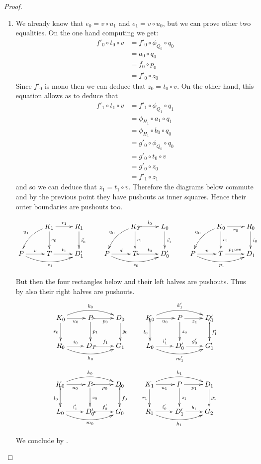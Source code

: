 \begin{proof}
\begin{enumerate}
	\item We already know that $e_0=v\circ u_1$ and $e_1=v\circ u_0$, but we can prove other two equalities. On the one hand computing we get:
	\begin{align*}
		f'_0\circ t_0\circ v&=f'_0\circ \phi_{Q_0}\circ q_0\\&=a_0\circ q_0\\&=f_0\circ p_0\\&=f'_0\circ z_0
	\end{align*}
	Since $f'_0$ is mono then we can deduce that $z_0=t_0\circ v$. On the other hand, this equation allows as to deduce that
	\begin{align*}
	f'_1\circ t_1\circ v&=f'_1\circ \phi_{Q_1}\circ q_1\\&=\phi_{H_1}\circ a_1\circ q_1\\&=\phi_{H_1}\circ b_0\circ q_0\\&=g'_0\circ \phi_{Q_0}\circ q_0\\&=g'_0\circ t_0\circ v\\&=g'_0\circ z_0\\&=f'_1\circ z_1
	\end{align*}
	and so we can deduce that $z_1=t_1\circ v$. Therefore the diagrams below commute and by the previous point they have pushouts as inner squares. Hence their outer boundaries are pushouts too.
	 
	\[\xymatrix{&K_1  \ar@/_.3cm/[dl]_{u_1}\ar[d]^{e_0} \ar[r]^{r_1} & R_1 \ar[d]^{i'_0} && K_0 \ar@/_.3cm/[dl]_{u_0}\ar@{>->}[r]^{l_0} \ar[d]^{e_1}& L_0 \ar[d]^{i'_1}&& K_0 \ar@/_.3cm/[dl]_{u_0} \ar[r]_{r_0} \ar[d]^{e_1}& R_0  \ar[d]^{i_0}\\ P\ar@/_.4cm/[rr]_{z_1}\ar[r]^{v} &T \ar[r]^{t_1} &  D'_1 &P \ar@/_.4cm/[rr]_{z_0}\ar[r]^{d}& T \ar@{>->}[r]^{t_0}  &D'_0 &P\ar@/_.4cm/[rr]_{p_1}\ar[r]^{v}&T \ar[r]^-{p_1\circ w}& D_1}\]
	
	But then the four rectangles below and their left halves are pushouts. Thus by  also their right halves are pushouts. 
	\[\xymatrix{K_0 \ar@/^.4cm/[rr]^{k_0}\ar[d]_{r_0}\ar[r]_{u_0}
		&P\ar[d]^{p_1} \ar@{>->}[r]_{p_0} & D_0 \ar[d]^{g_0}&K_0
		\ar@/^.4cm/[rr]^{k'_1}\ar@{>->}[d]_{l_0}\ar[r]_{u_0}
		&P\ar@{>}[d]^{z_0} \ar[r]_{z_1} & D'_1 \ar@{>->}[d]^{f'_1}\\
		R_0 \ar@/_.4cm/[rr]_{h_0} \ar[r]^{i_0}&D_1 \ar@{>->}[r]^{f_1}
		& G_1&L_0 \ar@/_.4cm/[rr]_{m'_1} \ar[r]^{i'_1}&D'_0\ar[r]^{g'_0} &
		G'_1}\]
	\[\xymatrix{K_0
		\ar@/^.4cm/[rr]^{k_0}\ar@{>->}[d]_{l_0}\ar[r]_{u_0}
		&P\ar@{>}[d]^{z_0} \ar@{>->}[r]_{p_0} & D_0
		\ar@{>->}[d]^{f_0}&K_1
		\ar@/^.4cm/[rr]^{k_1}\ar[d]_{r_1}\ar[r]_{u_1}
		&P\ar[d]^{z_1} \ar[r]_{p_1} & D_1 \ar[d]^{g_1}\\
		L_0 \ar@/_.4cm/[rr]_{m_0} \ar[r]^{i'_1}&D'_0 \ar@{>->}[r]^{f'_0}
		& G_0&R_1 \ar@/_.4cm/[rr]_{h_1} \ar[r]^{i'_0}&D'_1 \ar[r]^{b_1}
		& G_2}\]
	
	We conclude by . \qedhere 
	\end{enumerate}
\end{proof}

